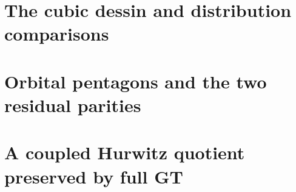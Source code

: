 \documentclass[11pt]{article}
\begin{document}
\section{The cubic dessin and distribution comparisons}








\section{Orbital pentagons and the two residual parities}







\section{A coupled Hurwitz quotient preserved by full GT}





\end{document}
